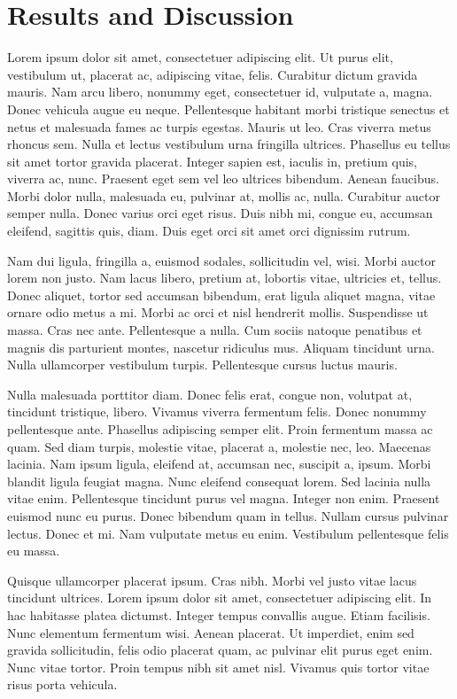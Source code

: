 \documentclass[12pt,a4paper,twoside,openright]{report}
\begin{document}
\cleardoublepage


\chapter{Results and Discussion}
Lorem ipsum dolor sit amet, consectetuer adipiscing elit. Ut purus elit, vestibulum ut, placerat ac, adipiscing vitae, felis. Curabitur dictum gravida mauris. Nam arcu libero, nonummy eget, consectetuer id, vulputate a, magna. Donec vehicula augue eu neque. Pellentesque habitant morbi tristique senectus et netus et malesuada fames ac turpis egestas. Mauris ut leo. Cras viverra metus rhoncus sem. Nulla et lectus vestibulum urna fringilla ultrices. Phasellus eu tellus sit amet tortor gravida placerat. Integer sapien est, iaculis in, pretium quis, viverra ac, nunc. Praesent eget sem vel leo ultrices bibendum. Aenean faucibus. Morbi dolor nulla, malesuada eu, pulvinar at, mollis ac, nulla. Curabitur auctor semper nulla. Donec varius orci eget risus. Duis nibh mi, congue eu, accumsan eleifend, sagittis quis, diam. Duis eget orci sit amet orci dignissim rutrum.

Nam dui ligula, fringilla a, euismod sodales, sollicitudin vel, wisi. Morbi auctor lorem non justo. Nam lacus libero, pretium at, lobortis vitae, ultricies et, tellus. Donec aliquet, tortor sed accumsan bibendum, erat ligula aliquet magna, vitae ornare odio metus a mi. Morbi ac orci et nisl hendrerit mollis. Suspendisse ut massa. Cras nec ante. Pellentesque a nulla. Cum sociis natoque penatibus et magnis dis parturient montes, nascetur ridiculus mus. Aliquam tincidunt urna. Nulla ullamcorper vestibulum turpis. Pellentesque cursus luctus mauris.

Nulla malesuada porttitor diam. Donec felis erat, congue non, volutpat at, tincidunt tristique, libero. Vivamus viverra fermentum felis. Donec nonummy pellentesque ante. Phasellus adipiscing semper elit. Proin fermentum massa ac quam. Sed diam turpis, molestie vitae, placerat a, molestie nec, leo. Maecenas lacinia. Nam ipsum ligula, eleifend at, accumsan nec, suscipit a, ipsum. Morbi blandit ligula feugiat magna. Nunc eleifend consequat lorem. Sed lacinia nulla vitae enim. Pellentesque tincidunt purus vel magna. Integer non enim. Praesent euismod nunc eu purus. Donec bibendum quam in tellus. Nullam cursus pulvinar lectus. Donec et mi. Nam vulputate metus eu enim. Vestibulum pellentesque felis eu massa.

Quisque ullamcorper placerat ipsum. Cras nibh. Morbi vel justo vitae lacus tincidunt ultrices. Lorem ipsum dolor sit amet, consectetuer adipiscing elit. In hac habitasse platea dictumst. Integer tempus convallis augue. Etiam facilisis. Nunc elementum fermentum wisi. Aenean placerat. Ut imperdiet, enim sed gravida sollicitudin, felis odio placerat quam, ac pulvinar elit purus eget enim. Nunc vitae tortor. Proin tempus nibh sit amet nisl. Vivamus quis tortor vitae risus porta vehicula.
\end{document}

